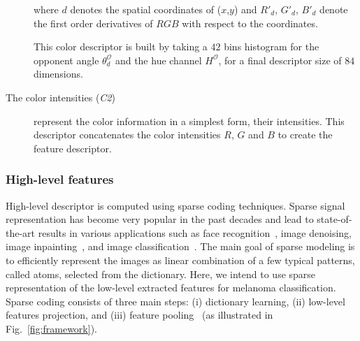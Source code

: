 \begin{description}
\noindent where $d$ denotes the spatial coordinates of ($x$,$y$) and $R'_{d}$, $G'_{d}$, $B'_{d}$ denote the first order derivatives of $RGB$ with respect to the coordinates.

This color descriptor is built by taking a $42$ bins histogram for the opponent angle $\theta^{\mathcal{O}}_{d}$ and the hue channel $H^{\mathcal{O}}$, for a final descriptor size of $84$ dimensions.

\item[The color intensities (\emph{C2})] represent the color information in a simplest form, their intensities.
This descriptor concatenates the color intensities $R$, $G$ and $B$ to create the feature descriptor.
\end{description}

\subsubsection{High-level features}
High-level descriptor is computed using sparse coding techniques. Sparse signal representation has become very popular in the past decades and lead to state-of-the-art results in various applications such as face recognition~\cite{wright2009robust}, image denoising, image inpainting~\cite{elad2006image}, and image classification~\cite{sidibe2015discrimination}. The main goal of sparse modeling is to efficiently represent the images as linear combination of a few typical patterns, called atoms, selected from the dictionary. Here, we intend to use sparse representation of the low-level extracted features for melanoma classification. Sparse coding consists of three main steps: (i) dictionary learning, (ii) low-level features projection, and (iii) feature pooling~\cite{rubinstein2008efficient} (as illustrated in Fig.~\ref{fig:framework}).



